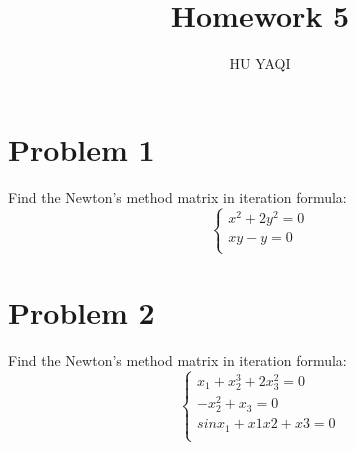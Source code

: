 \documentclass{article}
\title{ Homework 5 }
\author{HU YAQI}
\begin{document}
\maketitle
\setlength{\parindent}{0pt}

\section{ Problem 1 }
Find the Newton's method matrix in iteration formula:\\
$$
\left \{
\begin{array}{lr}
x^2+2y^2=0 \\
xy-y=0 \\
\end{array}
\right.
$$
\section{ Problem 2 }
Find the Newton's method matrix in iteration formula:\\
$$
\left \{
\begin{array}{lr}
x_1+x_2^3+2x_3^2=0 \\
-x_2^2+x_3=0 \\
sinx_1+x1x2+x3=0\\
\end{array}
\right.
$$
\end{document}

